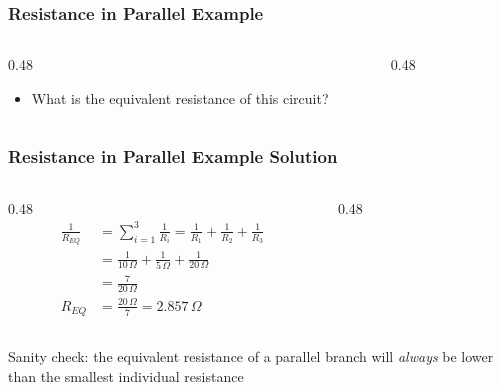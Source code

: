 \begin{frame}
    \frametitle{Resistance in Parallel Example}

	\begin{columns}
        \begin{column}{0.48\linewidth}
            \begin{itemize}[<+- | alert@+>]
                \item What is the equivalent resistance of this circuit?
            \end{itemize}
        \end{column}
        \begin{column}{0.48\linewidth}
            \begin{figure}
                \centering
                \resizebox{\columnwidth}{!}{
                    
                }
            \end{figure}
        \end{column}
	\end{columns}
\end{frame}

\begin{frame}
    \frametitle{Resistance in Parallel Example Solution}

	\begin{columns}
        \begin{column}{0.48\linewidth}
            \[
                \begin{aligned}
                    \frac{1}{R_{EQ}}&=\sum_{i=1}^{3}\frac{1}{R_i}=\frac{1}{R_1}+\frac{1}{R_2}+ \frac{1}{R_3}\\
                    &=\frac{1}{10\,\Omega}+\frac{1}{5\,\Omega}+\frac{1}{20\,\Omega}\\
                    &=\frac{7}{20\,\Omega}\\
                    R_{EQ}&=\frac{20\,\Omega}{7}=2.857\,\Omega
                \end{aligned}
            \]
        \end{column}
        \begin{column}{0.48\linewidth}
            \begin{figure}
                \centering
                \resizebox{\columnwidth}{!}{
                    
                }
            \end{figure}
        \end{column}
	\end{columns}

    \centering
    {\footnotesize Sanity check: the equivalent resistance of a parallel branch will \emph{always} be lower than the smallest individual resistance\par}
\end{frame}

